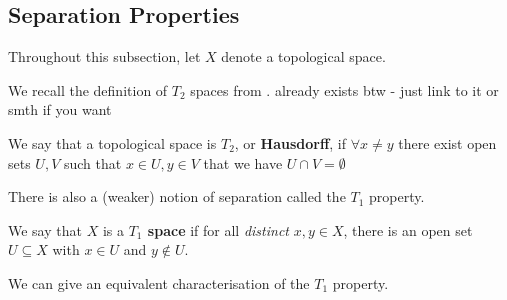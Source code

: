\subsection{Separation Properties}


Throughout this subsection, let $X$ denote a topological space.

We recall the definition of $T_2$ spaces from .
 already exists btw - just link to it or smth if you want
\begin{boxdefinition}
    We say that a topological space is \textbf{$T_2$}, or \textbf{Hausdorff}, if $\forall x\neq y$ there exist open sets $U, V$ such that $x\in U, y \in V$ that we have $U\cap V=\emptyset$
\end{boxdefinition}

There is also a (weaker) notion of separation called the $T_1$ property.

\begin{boxdefinition}[$T_1$ property]
    We say that $X$ is a \textbf{$T_1$ space} if for all \textit{distinct} $x, y \in X$, there is an open set $U \subseteq X$ with $x \in U$ and $y \notin U$.
\end{boxdefinition}

We can give an equivalent characterisation of the $T_1$ property.

